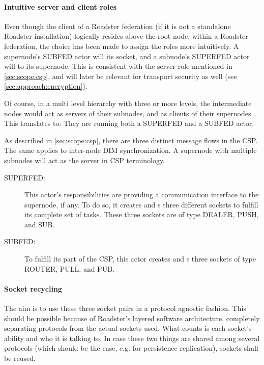 \paragraph{Intuitive server and client roles}
Even though the client of a Roadster federation (if it is not a standalone
Roadster installation) logically resides above the root node, within a Roadster
federation, the choice has been made to assign the roles more intuitively. A
supernode's SUBFED actor will  its socket, and a subnode's
SUPERFED actor will  to its supernode. This is consistent
with the server role mentioned in \autoref{sec:scope:csp}, and will later be
relevant for transport security as well (see \autoref{sec:approach:encryption}).

Of course, in a multi level hierarchy with three or more levels, the
intermediate nodes would act as servers of their subnodes, and as clients of
their supernodes. This translates to: They are running both a SUPERFED and a SUBFED
actor.

As described in \autoref{sec:scope:csp}, there are three distinct message flows
in the \gls{CSP}. The same applies to inter-node DIM synchronization. A
supernode with multiple subnodes will act as the server in CSP terminology.

\begin{description}
	\item [SUPERFED:]
		This actor's responsibilities are providing a
		communication interface to the supernode, if any. To do so, it
		creates and s three different sockets to fulfill
		its complete set of tasks. These three sockets are of type
		DEALER, PUSH, and SUB.

	\item [SUBFED:]
		To fulfill its part of the CSP, this actor creates
		and s three sockets of type ROUTER, PULL, and PUB.
\end{description}

\paragraph{Socket recycling}
The aim is to use these three socket pairs in a protocol agnostic fashion. This
should be possible because of Roadster's layered software architecture,
completely separating protocols from the actual sockets used. What counts is
each socket's ability and who it is talking to. In case these two things are shared
among several protocols (which should be the case, e.g. for persistence
replication), sockets shall be reused.

